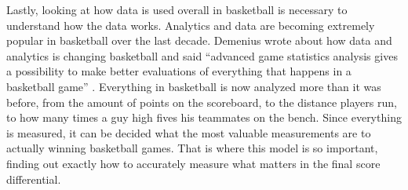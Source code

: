 \documentclass{article}
\begin{document}
\newline \indent Lastly, looking at how data is used overall in basketball is necessary to understand how the data works. Analytics and data are becoming extremely popular in basketball over the last decade. Demenius wrote about how data and analytics is changing basketball and said “advanced game statistics analysis gives a possibility to make better evaluations of everything that happens in a basketball game” \citep{demenius}. Everything in basketball is now analyzed more than it was before, from the amount of points on the scoreboard, to the distance players run, to how many times a guy high fives his teammates on the bench. Since everything is measured, it can be decided what the most valuable measurements are to actually winning basketball games. That is where this model is so important, finding out exactly how to accurately measure what matters in the final score differential. 
\end{document}
